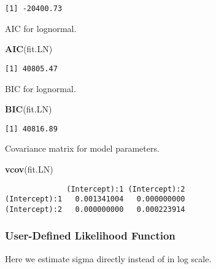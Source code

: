 \documentclass[]{book}
\newenvironment{Shaded}{\begin{snugshade}}{\end{snugshade}}
\newcommand{\KeywordTok}[1]{\textcolor[rgb]{0.13,0.29,0.53}{\textbf{#1}}}
\newcommand{\NormalTok}[1]{#1}
\theoremstyle{definition}
\theoremstyle{definition}
\theoremstyle{definition}
\theoremstyle{remark}
\begin{document}
\begin{verbatim}
[1] -20400.73
\end{verbatim}

AIC for lognormal.

\begin{Shaded}
\begin{Highlighting}[]
\KeywordTok{AIC}\NormalTok{(fit.LN)                 }
\end{Highlighting}
\end{Shaded}

\begin{verbatim}
[1] 40805.47
\end{verbatim}

BIC for lognormal.

\begin{Shaded}
\begin{Highlighting}[]
\KeywordTok{BIC}\NormalTok{(fit.LN)                 }
\end{Highlighting}
\end{Shaded}

\begin{verbatim}
[1] 40816.89
\end{verbatim}

Covariance matrix for model parameters.

\begin{Shaded}
\begin{Highlighting}[]
\KeywordTok{vcov}\NormalTok{(fit.LN)                 }
\end{Highlighting}
\end{Shaded}

\begin{verbatim}
              (Intercept):1 (Intercept):2
(Intercept):1   0.001341004   0.000000000
(Intercept):2   0.000000000   0.000223914
\end{verbatim}

\subsubsection{User-Defined Likelihood
Function}\label{user-defined-likelihood-function}

Here we estimate sigma directly instead of in log scale.
\end{document}
